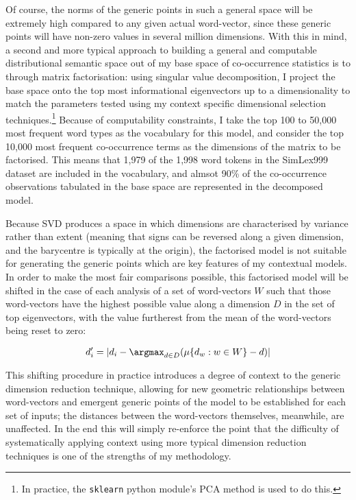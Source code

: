 Of course, the norms of the generic points in such a general space will be extremely high compared to any given actual word-vector, since these generic points will have non-zero values in several million dimensions.  With this in mind, a second and more typical approach to building a general and computable distributional semantic space out of my base space of co-occurrence statistics is to through matrix factorisation: using singular value decomposition, I project the base space onto the top most informational eigenvectors up to a dimensionality to match the parameters tested using my context specific dimensional selection techniques.\footnote{In practice, the \texttt{sklearn} python module's PCA method is used to do this.}  Because of computability constraints, I take the top 100 to 50,000 most frequent word types as the vocabulary for this model, and consider the top 10,000 most frequent co-occurrence terms as the dimensions of the matrix to be factorised.  This means that 1,979 of the 1,998 word tokens in the SimLex999 dataset \citep[][discussed in detail in Chapter~\ref{chap:concepts}]{HillEA2014} are included in the vocabulary, and almsot 90\% of the co-occurrence observations tabulated in the base space are represented in the decomposed model.

Because SVD produces a space in which dimensions are characterised by variance rather than extent (meaning that signs can be reversed along a given dimension, and the barycentre is typically at the origin), the factorised model is not suitable for generating the generic points which are key features of my contextual models.  In order to make the most fair comparisons possible, this factorised model will be shifted in the case of each analysis of a set of word-vectors $W$ such that those word-vectors have the highest possible value along a dimension $D$ in the set of top eigenvectors, with the value furtherest from the mean of the word-vectors being reset to zero:

\begin{equation}
d_i' = |d_i-\argmax_{d \in D}(\mu\{d_w:w \in W\}-d)|
\end{equation}

This shifting procedure in practice introduces a degree of context to the generic dimension reduction technique, allowing for new geometric relationships between word-vectors and emergent generic points of the model to be established for each set of inputs; the distances between the word-vectors themselves, meanwhile, are unaffected.  In the end this will simply re-enforce the point that the difficulty of systematically applying context using more typical dimension reduction techniques is one of the strengths of my methodology.

